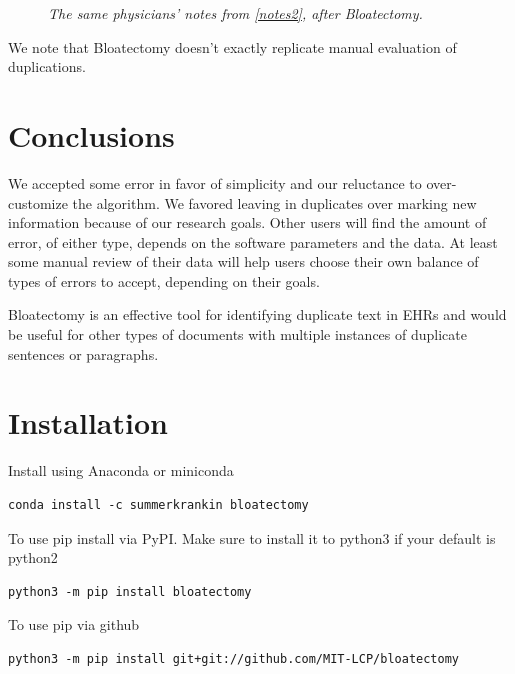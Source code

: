 \documentclass[runningheads,a4paper]{llncs}
\begin{document}
\begin{figure}
 \caption {\emph{ The same physicians'  notes from \ref{notes2}, after Bloatectomy.} }
 \label{output_notes2}
\end{figure}

\noindent We note that Bloatectomy doesn’t exactly replicate manual evaluation of duplications.   

\section{Conclusions}
\noindent We accepted some error in favor of simplicity and our reluctance to over-customize the algorithm. We favored leaving in duplicates over marking new information because of our research goals. Other users will find the amount of error, of either type, depends on the software parameters and the data. At least some manual review of their data will help users choose their own balance of types of errors to accept, depending on their goals.  

\noindent Bloatectomy is an effective tool for identifying duplicate text in EHRs and would be useful for other types of documents with multiple instances of duplicate sentences or paragraphs.

\section{Installation}

\noindent Install using Anaconda or miniconda

\begin{lstlisting}[frame=single, style=customcode]
conda install -c summerkrankin bloatectomy
\end{lstlisting}

\medskip

\noindent To use pip install via PyPI. Make sure to install it to python3 if your default is python2
\begin{lstlisting}[frame=single, style=customcode]
python3 -m pip install bloatectomy
\end{lstlisting}

\medskip

\noindent To use pip via github
\begin{lstlisting}[frame=single, style=customcode]
python3 -m pip install git+git://github.com/MIT-LCP/bloatectomy
\end{lstlisting}
\end{document}
